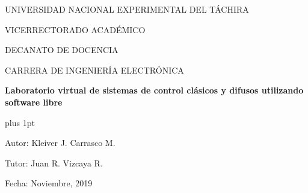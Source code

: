 \begin{center}
	UNIVERSIDAD NACIONAL EXPERIMENTAL DEL TÁCHIRA
	
	VICERRECTORADO ACADÉMICO
	
	DECANATO DE DOCENCIA
	
	CARRERA DE INGENIERÍA ELECTRÓNICA

	\vspace{30pt}

	{\large \textbf{Laboratorio virtual de sistemas de control clásicos y difusos utilizando software libre}\par}
\end{center}

\vspace{20pt}

\begin{flushright}
	\begin{spacing}{1}
		\parskip=0pt plus 1pt

		Autor: Kleiver J. Carrasco M.

		Tutor: Juan R. Vizcaya R.

		Fecha: Noviembre, 2019
		
	\end{spacing}	
\end{flushright}

\vspace{10pt}

\begin{abstract}
	\blindtext
\end{abstract}

